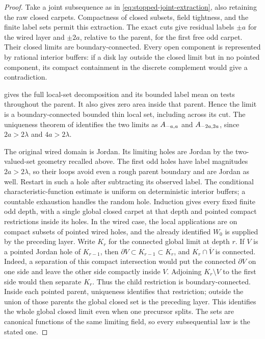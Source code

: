 \begin{proof}
Take a joint subsequence as in \eqref{eq:stopped-joint-extraction},
also retaining the raw closed carpets. Compactness of closed subsets,
field tightness, and the finite label sets permit this extraction.
The exact cuts give residual labels \(\pm a\) for the wired layer and
\(\pm2a\), relative to the parent, for the first free odd carpet.
Their closed limits are boundary-connected. Every open component is
represented by rational interior buffers: if a disk lay outside the
closed limit but in no pointed component, its compact containment in
the discrete complement would give a contradiction.

 gives the full local-set decomposition
and its bounded label mean on tests throughout the parent. It also
gives zero area inside that parent. Hence the limit is a
boundary-connected bounded thin local set, including across its cut.
The uniqueness theorem of \cite[Proposition~2]{ASW2017} identifies
the two limits as \(A_{-a,a}\) and \(A_{-2a,2a}\), since
\(2a>2\lambda\) and \(4a>2\lambda\).

The original wired domain is Jordan. Its limiting holes are Jordan by the
two-valued-set geometry recalled above. The first odd holes have
label magnitudes \(2a>2\lambda\), so their loops avoid even a rough
parent boundary and are Jordan as well. Restart in such a hole after
subtracting its observed label. The conditional characteristic-function
estimate is uniform on deterministic interior buffers; a countable
exhaustion handles the random hole. Induction gives every fixed finite
odd depth, with a single global closed carpet at that depth and pointed
compact restrictions inside its holes. In the wired case, the local
applications are on compact subsets of pointed wired holes, and the
already identified \(W_0\) is supplied by the preceding layer.
Write \(K_r\) for the connected global limit at depth \(r\). If \(V\)
is a pointed Jordan hole of \(K_{r-1}\), then
\(\partial V\subset K_{r-1}\subset K_r\), and
\(K_r\cap\overline V\) is connected. Indeed, a separation of this
compact intersection would put the connected \(\partial V\) on one
side and leave the other side compactly inside \(V\). Adjoining
\(K_r\setminus V\) to the first side would then separate \(K_r\).
Thus the child restriction is boundary-connected. Inside each pointed
parent, uniqueness identifies that restriction; outside the union of
those parents the global closed set is the preceding layer. This identifies
the whole global closed limit even when one precursor splits. The sets
are canonical functions of the same limiting field, so every subsequential
law is the stated one.
\end{proof}

